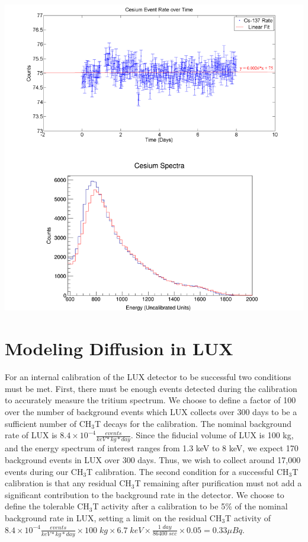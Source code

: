 \documentclass[a4paper,12pt]{article}
\begin{document}
\begin{center}
\includegraphics[scale=0.6]{Cesium_Combined_Fit.png}
\end{center}

\section{Modeling Diffusion in LUX}

For an internal calibration of the LUX detector to be successful two conditions must be met.  First, there must be enough events detected during the calibration to accurately measure the tritium spectrum.  We choose to define a factor of 100 over the number of  background events which LUX collects over 300 days to be a sufficient number of CH$_3$T decays for the calibration.  The nominal background rate of LUX is $8.4 \times 10^{-4} \frac{events}{keV*kg*day}$.  Since the fiducial volume of LUX is 100 kg, and the energy spectrum of interest ranges from 1.3 keV to 8 keV, we expect 170 background events in LUX over 300 days.  Thus, we wish to collect around 17,000 events during our CH$_3$T calibration.  The second condition for a successful CH$_3$T calibration is that any residual CH$_3$T remaining after purification must not add a significant contribution to the background rate in the detector.  We choose to define the tolerable CH$_3$T activity after a calibration to be 5\% of the nominal background rate in LUX, setting a limit on the residual CH$_3$T activity of $8.4 \times 10^{-4} \frac{events}{keV*kg*day} \times 100 \; kg \times 6.7 \; keV \times \frac{1 \; day}{86400 \; sec} \times 0.05 = 0.33 \mu Bq$.
\end{document}
